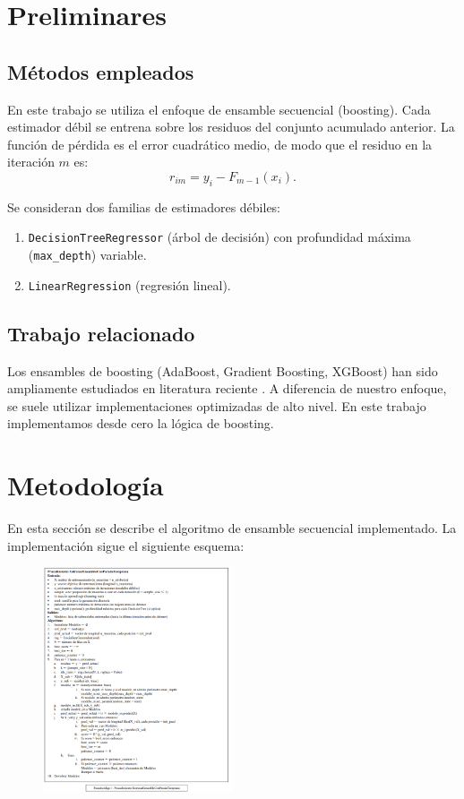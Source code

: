 \documentclass[conference,a4paper]{IEEEtran}
\begin{document}
\section{Preliminares}
\subsection{Métodos empleados}
En este trabajo se utiliza el enfoque de ensamble secuencial (boosting). Cada estimador débil se entrena sobre los residuos del conjunto acumulado anterior. La función de pérdida es el error cuadrático medio, de modo que el residuo en la iteración \(m\) es:
\begin{equation}
r_{im} = y_i - F_{m-1}(x_i).
\end{equation}

Se consideran dos familias de estimadores débiles:
\begin{enumerate}
    \item \texttt{DecisionTreeRegressor} (árbol de decisión) con profundidad máxima (\texttt{max\_depth}) variable.
    \item \texttt{LinearRegression} (regresión lineal).
\end{enumerate}

\subsection{Trabajo relacionado}
Los ensambles de boosting (AdaBoost, Gradient Boosting, XGBoost) han sido ampliamente estudiados en literatura reciente \cite{freund1997decision, friedman2001elements, chen2016xgboost}. A diferencia de nuestro enfoque, se suele utilizar implementaciones optimizadas de alto nivel. En este trabajo implementamos desde cero la lógica de boosting.


\section{Metodología}
En esta sección se describe el algoritmo de ensamble secuencial implementado. La implementación sigue el siguiente esquema:

\begin{figure}[h]
    \centering
    \includegraphics[width=0.5\textwidth]{early.png}
    \caption{}
    \label{fig:1}
\end{figure}
\end{document}
